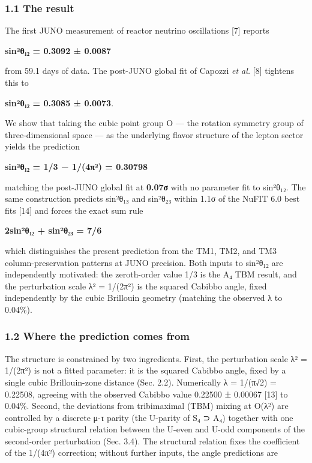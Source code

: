 \documentclass[
  11pt,
  letterpaper,
]{article}
\begin{document}
\hypertarget{the-result}{%
\subsubsection{1.1 The result}\label{the-result}}

The first JUNO measurement of reactor neutrino oscillations {[}7{]}
reports

\textbf{sin²θ₁₂ = 0.3092 ± 0.0087}

from 59.1 days of data. The post-JUNO global fit of Capozzi \emph{et
al.} {[}8{]} tightens this to

\textbf{sin²θ₁₂ = 0.3085 ± 0.0073}.

We show that taking the cubic point group O --- the rotation symmetry
group of three-dimensional space --- as the underlying flavor structure
of the lepton sector yields the prediction

\textbf{sin²θ₁₂ = 1/3 − 1/(4π²) = 0.30798}

matching the post-JUNO global fit at \textbf{0.07σ} with no parameter
fit to sin²θ₁₂. The same construction predicts sin²θ₁₃ and sin²θ₂₃
within 1.1σ of the NuFIT 6.0 best fits {[}14{]} and forces the exact sum
rule

\textbf{2sin²θ₁₂ + sin²θ₂₃ = 7/6}

which distinguishes the present prediction from the TM1, TM2, and TM3
column-preservation patterns at JUNO precision. Both inputs to sin²θ₁₂
are independently motivated: the zeroth-order value 1/3 is the A₄ TBM
result, and the perturbation scale λ² = 1/(2π²) is the squared Cabibbo
angle, fixed independently by the cubic Brillouin geometry (matching the
observed λ to 0.04\%).

\hypertarget{where-the-prediction-comes-from}{%
\subsubsection{1.2 Where the prediction comes
from}\label{where-the-prediction-comes-from}}

The structure is constrained by two ingredients. First, the perturbation
scale λ² = 1/(2π²) is not a fitted parameter: it is the squared Cabibbo
angle, fixed by a single cubic Brillouin-zone distance (Sec. 2.2).
Numerically λ = 1/(π√2) = 0.22508, agreeing with the observed Cabibbo
value 0.22500 ± 0.00067 {[}13{]} to 0.04\%. Second, the deviations from
tribimaximal (TBM) mixing at O(λ²) are controlled by a discrete μ-τ
parity (the U-parity of S₄ ⊃ A₄) together with one cubic-group
structural relation between the U-even and U-odd components of the
second-order perturbation (Sec. 3.4). The structural relation fixes the
coefficient of the 1/(4π²) correction; without further inputs, the angle
predictions are
\end{document}
